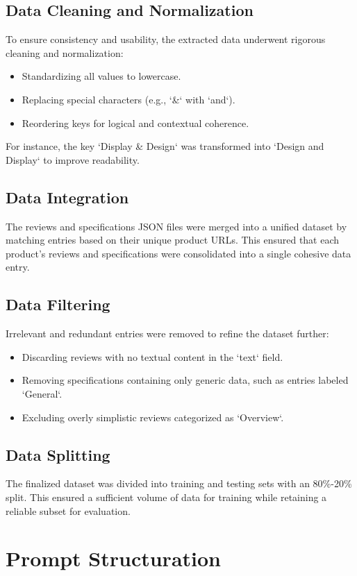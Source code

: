 \subsection{Data Cleaning and Normalization}
To ensure consistency and usability, the extracted data underwent rigorous cleaning and normalization:
\begin{itemize}
    \item Standardizing all values to lowercase.
    \item Replacing special characters (e.g., `\&` with `and`).
    \item Reordering keys for logical and contextual coherence.
\end{itemize}
For instance, the key `Display \& Design` was transformed into `Design and Display` to improve readability.

\subsection{Data Integration}
The reviews and specifications JSON files were merged into a unified dataset by matching entries based on their unique product URLs. This ensured that each product's reviews and specifications were consolidated into a single cohesive data entry.

\subsection{Data Filtering}
Irrelevant and redundant entries were removed to refine the dataset further:
\begin{itemize}
    \item Discarding reviews with no textual content in the `text` field.
    \item Removing specifications containing only generic data, such as entries labeled `General`.
    \item Excluding overly simplistic reviews categorized as `Overview`.
\end{itemize}

\subsection{Data Splitting}
The finalized dataset was divided into training and testing sets with an 80\%-20\% split. This ensured a sufficient volume of data for training while retaining a reliable subset for evaluation.

\section{Prompt Structuration}
